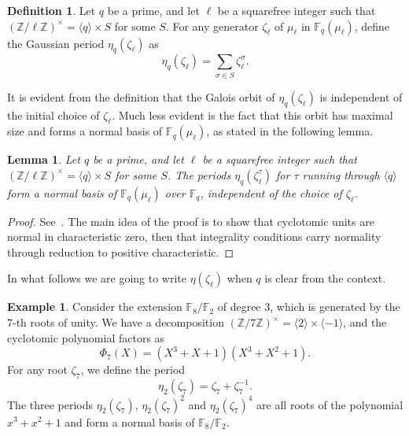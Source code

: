 \documentclass[12pt]{article}
\theoremstyle{plain}
\newtheorem{lemma}[theorem]{Lemma}
\theoremstyle{definition}
\newtheorem{definition}[theorem]{Definition}
\newtheorem{example}[theorem]{Example}
\def\Z{\ensuremath{\mathbb{Z}}}
\def\F{\ensuremath{\mathbb{F}}}
\begin{document}
\begin{definition}
  Let $q$ be a prime, and let $\ell$ be a squarefree integer such that
  $(\Z/\ell\Z)^\times = \langle q\rangle \times S$ for some $S$.  For any
  generator $\zeta_\ell$ of $\mu_\ell$ in $\F_q(\mu_\ell)$, define the
  Gaussian period $\eta_q(\zeta_\ell)$ as
  \begin{equation}
    \eta_q(\zeta_\ell) = \sum_{\sigma\in S}{\zeta_\ell^{\sigma}}.
  \end{equation}
\end{definition}

It is evident from the definition that the Galois orbit of
$\eta_q(\zeta_\ell)$ is independent of the initial choice of
$\zeta_\ell$. Much less evident is the fact that this orbit has
maximal size and forms a normal basis of $\F_q(\mu_\ell)$, as stated
in the following lemma.

\begin{lemma}
  \label{th:gaussian}
  Let $q$ be a prime, and let $\ell$ be a squarefree integer such that
  $(\Z/\ell\Z)^\times = \langle q\rangle \times S$ for some $S$.  The
  periods $\eta_q(\zeta_\ell^\tau)$ for $\tau$ running through
  $\langle q\rangle$ form a normal basis of $\F_q(\mu_\ell)$ over
  $\F_q$, independent of the choice of $\zeta_\ell$.
\end{lemma}
\begin{proof}
  See~\cite[Main Theorem]{feisel1999normal}.
  The main idea of the proof is to show that cyclotomic units are
  normal in characteristic zero, then that integrality conditions
  carry normality through reduction to positive characteristic.
\end{proof}

In what follows we are going to write $\eta(\zeta_\ell)$ when $q$ is
clear from the context.

\begin{example} 
  Consider the extension $\F_8/\F_2$ of degree $3$, which is generated
  by the $7$-th roots of unity. We have a decomposition
  $(\Z/7\Z)^\times=\langle 2\rangle\times\langle-1\rangle$, and the
  cyclotomic polynomial factors as
  \begin{equation}
    \Phi_7(X) = (X^3 + X + 1) (X^3 + X^2 + 1).
  \end{equation}
  For any root $\zeta_7$, we define the period
  \begin{equation}
    \eta_2(\zeta_7) = \zeta_7+\zeta_7^{-1}.
  \end{equation}
  The three periods $\eta_2(\zeta_7)$, $\eta_2(\zeta_7)^2$ and
  $\eta_2(\zeta_7)^4$ are all roots of the polynomial $x^3+x^2+1$ and
  form a normal basis of $\F_8/\F_2$.
\end{example}
\end{document}
